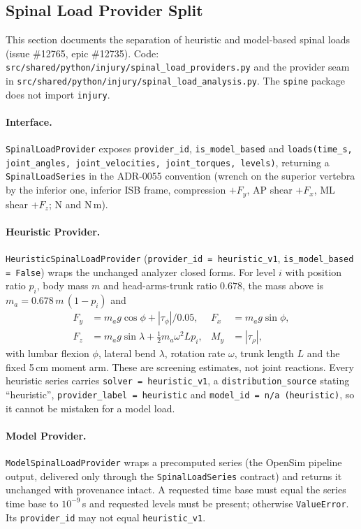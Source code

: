 \subsection{Spinal Load Provider Split}
\label{sec:spn-12}

This section documents the separation of heuristic and model-based spinal
loads (issue \#12765, epic \#12735). Code:
\texttt{src/shared/python/injury/spinal\_load\_providers.py} and the provider
seam in \texttt{src/shared/python/injury/spinal\_load\_analysis.py}. The
\texttt{spine} package does not import \texttt{injury}.

\paragraph{Interface.}
\texttt{SpinalLoadProvider} exposes \texttt{provider\_id}, \texttt{is\_model\_based}
and \texttt{loads(time\_s, joint\_angles, joint\_velocities, joint\_torques,
levels)}, returning a \texttt{SpinalLoadSeries} in the ADR-0055 convention
(wrench on the superior vertebra by the inferior one, inferior ISB frame,
compression $+F_y$, AP shear $+F_x$, ML shear $+F_z$; N and N\,m).

\paragraph{Heuristic Provider.}
\texttt{HeuristicSpinalLoadProvider} (\texttt{provider\_id = heuristic\_v1},
\texttt{is\_model\_based = False}) wraps the unchanged analyzer closed forms.
For level $i$ with position ratio $p_i$, body mass $m$ and head-arms-trunk
ratio $0.678$, the mass above is $m_a = 0.678\,m\,(1-p_i)$ and
\begin{align}
  F_y &= m_a g\cos\phi + |\tau_\phi|/0.05, &
  F_x &= m_a g\sin\phi, \\
  F_z &= m_a g\sin\lambda + \tfrac12 m_a \omega^2 L p_i, &
  M_y &= |\tau_\rho|,
\end{align}
with lumbar flexion $\phi$, lateral bend $\lambda$, rotation rate $\omega$,
trunk length $L$ and the fixed 5\,cm moment arm. These are screening
estimates, not joint reactions. Every heuristic series carries
\texttt{solver = heuristic\_v1}, a \texttt{distribution\_source} stating
``heuristic'', \texttt{provider\_label = heuristic} and \texttt{model\_id =
n/a (heuristic)}, so it cannot be mistaken for a model load.

\paragraph{Model Provider.}
\texttt{ModelSpinalLoadProvider} wraps a precomputed series (the OpenSim
pipeline output, delivered only through the \texttt{SpinalLoadSeries} contract)
and returns it unchanged with provenance intact. A requested time base must
equal the series time base to $10^{-9}$\,s and requested levels must be present;
otherwise \texttt{ValueError}. Its \texttt{provider\_id} may not equal
\texttt{heuristic\_v1}.

